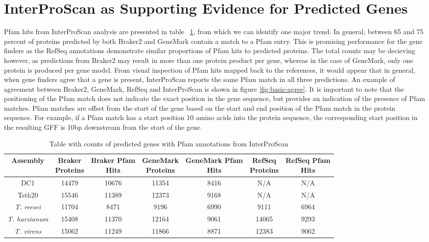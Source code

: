 \section{InterProScan as Supporting Evidence for Predicted Genes}

Pfam hits from InterProScan analysis are presented in table
~\ref{table:ips-pfam}, from which we can identify one major trend. In
general, between 65 and 75 percent of proteins predicted by both
Braker2 and GeneMark contain a match to a Pfam entry. This is
promising performance for the gene finders as the RefSeq annotations
demonstrate similar proportions of Pfam hits to predicted
proteins. The total counts may be decieving however, as predictions
from Braker2 may result in more than one protein product per gene,
whereas in the case of GeneMark, only one protein is produced per gene
model. From visual inspection of Pfam hits mapped back to the
references, it would appear that in general, when gene finders agree
that a gene is present, InterProScan reports the same Pfam match in
all three predictions. An example of agreement between Braker2,
GeneMark, RefSeq and InterProScan is shown in figure
\ref{fig:basic-agree}. It is important to note that the positioning of
the Pfam match does not indicate the exact position in the gene
sequence, but provides an indication of the presence of Pfam
matches. Pfam matches are offset from the start of the gene based on
the start and end position of the Pfam match in the protein
sequence. For example, if a Pfam match has a start position 10 amino
acids into the protein sequence, the corresponding start position in
the resulting GFF is 10bp downstream from the start of the gene.

\begin{table}[h!]
  \centering
  \begin{tabular}{|c|c|c|c|c|c|c|}
    \hline
    Assembly & \makecell{Braker \\ Proteins} & \makecell{Braker Pfam \\ Hits} & \makecell{GeneMark \\ Proteins} & \makecell{GeneMark Pfam \\Hits} & \makecell{RefSeq \\ Proteins} & \makecell{RefSeq Pfam \\ Hits}  \\ \hline
    DC1 & 14479 & 10676 & 11354 & 8416  & N/A & N/A \\ \hline
    Tsth20 & 15546 & 11389 & 12373 & 9168 & N/A & N/A \\ \hline
    \textit{T. reesei} & 11704 & 8471 & 9196 & 6990 & 9111 & 6964 \\ \hline
    \textit{T. harzianum} & 15408 & 11370 & 12164 & 9061 & 14065 & 9293 \\ \hline
    \textit{T. virens} & 15062 & 11249 & 11866 & 8871 & 12383 & 9062 \\ \hline
  \end{tabular}
  \caption[InterProScan Pfam Evidence]{Table with counts of predicted
    genes with Pfam annotations from InterProScan}
  \label{table:ips-pfam}
\end{table}


